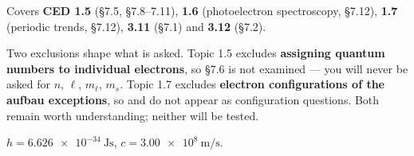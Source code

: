 \documentclass{apchem-exam}
\begin{document}
\apctitleblock

\begin{apcnote}
Covers \textbf{CED 1.5} (\S7.5, \S7.8--7.11), \textbf{1.6}
(photoelectron spectroscopy, \S7.12), \textbf{1.7} (periodic trends,
\S7.12), \textbf{3.11} (\S7.1) and \textbf{3.12} (\S7.2).

Two exclusions shape what is asked. Topic 1.5 excludes
\textbf{assigning quantum numbers to individual electrons}, so \S7.6 is
not examined --- you will never be asked for $n$, $\ell$, $m_\ell$,
$m_s$. Topic 1.7 excludes \textbf{electron configurations of the aufbau
exceptions}, so  and  do not appear as configuration
questions. Both remain worth understanding; neither will be tested.

$h = \SI{6.626e-34}{\joule\second}$, \;
$c = \SI{3.00e8}{\metre\per\second}$.
\end{apcnote}


\end{document}
